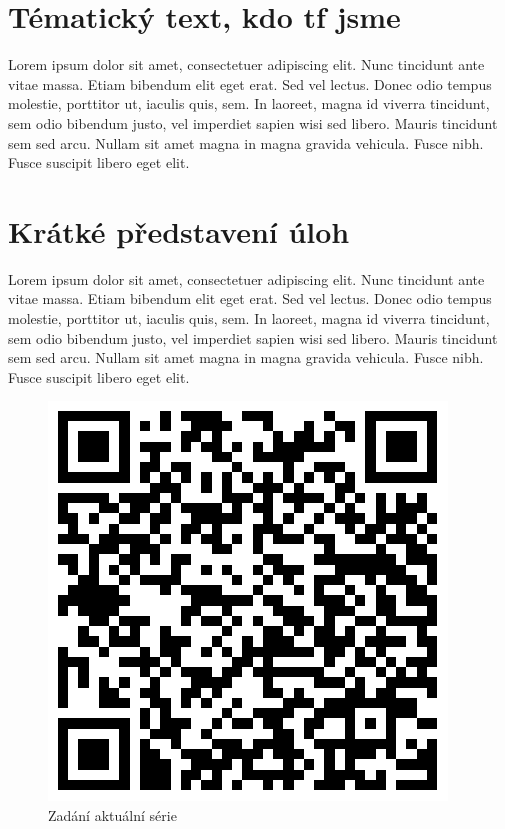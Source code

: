 \documentclass{../../style/mkia5}
\begin{document}
\section*{Tématický text, kdo tf jsme}

Lorem ipsum dolor sit amet, consectetuer adipiscing elit. Nunc tincidunt ante vitae massa. Etiam bibendum elit eget erat. Sed vel lectus. Donec odio tempus molestie, porttitor ut, iaculis quis, sem. In laoreet, magna id viverra tincidunt, sem odio bibendum justo, vel imperdiet sapien wisi sed libero. Mauris tincidunt sem sed arcu. Nullam sit amet magna in magna gravida vehicula. Fusce nibh. Fusce suscipit libero eget elit.
\section*{Krátké představení úloh}
Lorem ipsum dolor sit amet, consectetuer adipiscing elit. Nunc tincidunt ante vitae massa. Etiam bibendum elit eget erat. Sed vel lectus. Donec odio tempus molestie, porttitor ut, iaculis quis, sem. In laoreet, magna id viverra tincidunt, sem odio bibendum justo, vel imperdiet sapien wisi sed libero. Mauris tincidunt sem sed arcu. Nullam sit amet magna in magna gravida vehicula. Fusce nibh. Fusce suscipit libero eget elit.
\vspace{0.5cm}
\begin{figure}[H]
\begin{center}
\includegraphics[scale=0.3]{../qrcodes/MKI1/batch1el.png}
\\
Zadání aktuální série
\end{center}
\end{figure}
\end{document}
